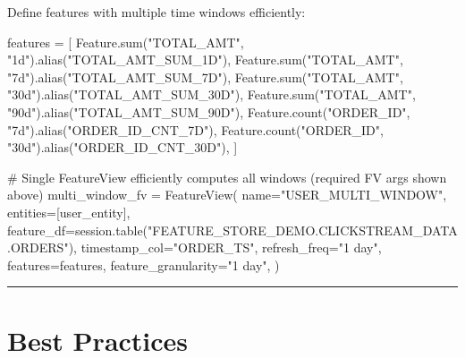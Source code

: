 \documentclass[
  letterpaper,
  DIV=11,
  numbers=noendperiod]{scrreprt}
\newenvironment{Shaded}{\begin{snugshade}}{\end{snugshade}}
\newcommand{\BuiltInTok}[1]{\textcolor[rgb]{0.00,0.23,0.31}{#1}}
\newcommand{\CommentTok}[1]{\textcolor[rgb]{0.37,0.37,0.37}{#1}}
\newcommand{\NormalTok}[1]{\textcolor[rgb]{0.00,0.23,0.31}{#1}}
\newcommand{\OperatorTok}[1]{\textcolor[rgb]{0.37,0.37,0.37}{#1}}
\newcommand{\StringTok}[1]{\textcolor[rgb]{0.13,0.47,0.30}{#1}}
\begin{document}
Define features with multiple time windows efficiently:

\begin{Shaded}
\begin{Highlighting}[]
\NormalTok{features }\OperatorTok{=}\NormalTok{ [}
\NormalTok{    Feature.}\BuiltInTok{sum}\NormalTok{(}\StringTok{"TOTAL\_AMT"}\NormalTok{, }\StringTok{"1d"}\NormalTok{).alias(}\StringTok{"TOTAL\_AMT\_SUM\_1D"}\NormalTok{),}
\NormalTok{    Feature.}\BuiltInTok{sum}\NormalTok{(}\StringTok{"TOTAL\_AMT"}\NormalTok{, }\StringTok{"7d"}\NormalTok{).alias(}\StringTok{"TOTAL\_AMT\_SUM\_7D"}\NormalTok{),}
\NormalTok{    Feature.}\BuiltInTok{sum}\NormalTok{(}\StringTok{"TOTAL\_AMT"}\NormalTok{, }\StringTok{"30d"}\NormalTok{).alias(}\StringTok{"TOTAL\_AMT\_SUM\_30D"}\NormalTok{),}
\NormalTok{    Feature.}\BuiltInTok{sum}\NormalTok{(}\StringTok{"TOTAL\_AMT"}\NormalTok{, }\StringTok{"90d"}\NormalTok{).alias(}\StringTok{"TOTAL\_AMT\_SUM\_90D"}\NormalTok{),}
\NormalTok{    Feature.count(}\StringTok{"ORDER\_ID"}\NormalTok{, }\StringTok{"7d"}\NormalTok{).alias(}\StringTok{"ORDER\_ID\_CNT\_7D"}\NormalTok{),}
\NormalTok{    Feature.count(}\StringTok{"ORDER\_ID"}\NormalTok{, }\StringTok{"30d"}\NormalTok{).alias(}\StringTok{"ORDER\_ID\_CNT\_30D"}\NormalTok{),}
\NormalTok{]}

\CommentTok{\# Single FeatureView efficiently computes all windows (required FV args shown above)}
\NormalTok{multi\_window\_fv }\OperatorTok{=}\NormalTok{ FeatureView(}
\NormalTok{    name}\OperatorTok{=}\StringTok{"USER\_MULTI\_WINDOW"}\NormalTok{,}
\NormalTok{    entities}\OperatorTok{=}\NormalTok{[user\_entity],}
\NormalTok{    feature\_df}\OperatorTok{=}\NormalTok{session.table(}\StringTok{"FEATURE\_STORE\_DEMO.CLICKSTREAM\_DATA.ORDERS"}\NormalTok{),}
\NormalTok{    timestamp\_col}\OperatorTok{=}\StringTok{"ORDER\_TS"}\NormalTok{,}
\NormalTok{    refresh\_freq}\OperatorTok{=}\StringTok{"1 day"}\NormalTok{,}
\NormalTok{    features}\OperatorTok{=}\NormalTok{features,}
\NormalTok{    feature\_granularity}\OperatorTok{=}\StringTok{"1 day"}\NormalTok{,}
\NormalTok{)}
\end{Highlighting}
\end{Shaded}

\begin{center}\rule{0.5\linewidth}{0.5pt}\end{center}

\hypertarget{best-practices-5}{%
\section{Best Practices}\label{best-practices-5}}
\end{document}

